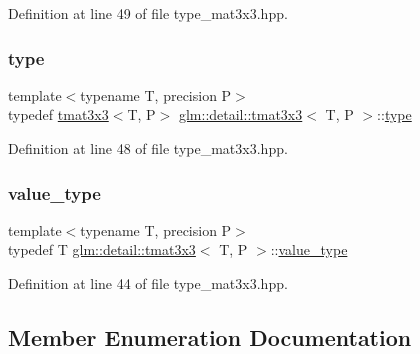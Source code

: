 Definition at line 49 of file type\+\_\+mat3x3.\+hpp.

\mbox{\label{structglm_1_1detail_1_1tmat3x3_a8da2644146b18508927325b04c3a9170}} 
\subsubsection{\texorpdfstring{type}{type}}
{\footnotesize\ttfamily template$<$typename T, precision P$>$ \\
typedef \hyperlink{structglm_1_1detail_1_1tmat3x3}{tmat3x3}$<$T, P$>$ \hyperlink{structglm_1_1detail_1_1tmat3x3}{glm\+::detail\+::tmat3x3}$<$ T, P $>$\+::\hyperlink{structglm_1_1detail_1_1tmat3x3_a8da2644146b18508927325b04c3a9170}{type}}



Definition at line 48 of file type\+\_\+mat3x3.\+hpp.

\mbox{\label{structglm_1_1detail_1_1tmat3x3_a42b16ee1a345e9626c90ff078ec056b4}} 
\subsubsection{\texorpdfstring{value\+\_\+type}{value\_type}}
{\footnotesize\ttfamily template$<$typename T, precision P$>$ \\
typedef T \hyperlink{structglm_1_1detail_1_1tmat3x3}{glm\+::detail\+::tmat3x3}$<$ T, P $>$\+::\hyperlink{structglm_1_1detail_1_1tmat3x3_a42b16ee1a345e9626c90ff078ec056b4}{value\+\_\+type}}



Definition at line 44 of file type\+\_\+mat3x3.\+hpp.



\subsection{Member Enumeration Documentation}
\mbox{\label{structglm_1_1detail_1_1tmat3x3_a24175afa829b47d3cc2a65860b16e103}} 
